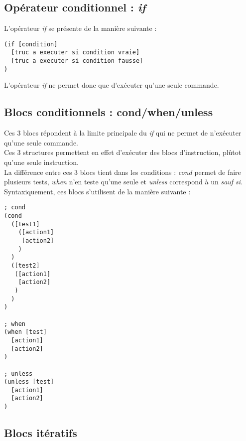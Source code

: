 \documentclass{report}
\begin{document}
\subsection{Opérateur conditionnel : \emph{if}}
L'opérateur \emph{if} se présente de la manière suivante :
\begin{verbatim}
(if [condition]
  [truc a executer si condition vraie]
  [truc a executer si condition fausse]
)
\end{verbatim}
L'opérateur \emph{if} ne permet donc que d'exécuter qu'une seule commande.

\subsection{Blocs conditionnels : cond/when/unless}
Ces 3 blocs répondent à la limite principale du \emph{if} qui ne permet de n'exécuter qu'une seule commande.\\
Ces 3 structures permettent en effet d'exécuter des blocs d'instruction, plûtot qu'une seule instruction.\\
La différence entre ces 3 blocs tient dans les conditions : \emph{cond} permet de faire plusieurs tests, \emph{when} n'en teste qu'une seule et \emph{unless} correspond à un \emph{sauf si}.\\
Syntaxiquement, ces blocs s'utilisent de la manière suivante :
\begin{lstlisting}
; cond
(cond 
  ([test1]
    ([action1]
     [action2]
    )
  )
  ([test2]
   ([action1]
    [action2]
   )
  )
)

; when
(when [test]
  [action1]
  [action2]
)

; unless
(unless [test]
  [action1]
  [action2]
)
\end{lstlisting}

\subsection{Blocs itératifs}
\end{document}
